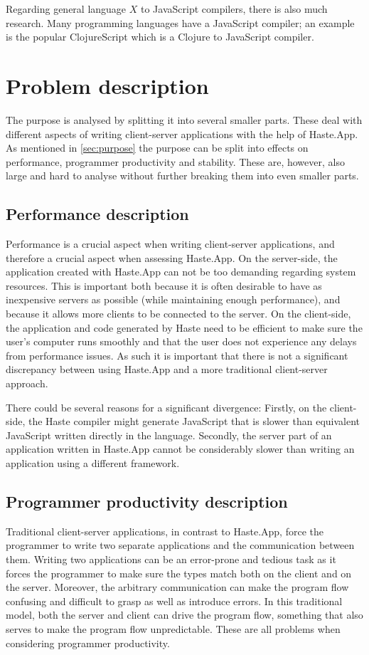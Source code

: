 \documentclass[a4paper]{article}
\begin{document}
Regarding general language $X$ to JavaScript compilers, there is also much research. Many programming languages have a JavaScript compiler; an example is the popular ClojureScript \cite{clojurescript-website} which is a Clojure to JavaScript compiler.

\section{Problem description}
\label{sec:problem}
The purpose is analysed by splitting it into several smaller parts. These deal with different aspects of writing client-server applications with the help of Haste.App. As mentioned in \cref{sec:purpose} the purpose can be split into effects on performance, programmer productivity and stability. These are, however, also large and hard to analyse without further breaking them into even smaller parts.


\subsection{Performance description}
Performance is a crucial aspect when writing client-server applications, and therefore a crucial aspect when assessing Haste.App. On the server-side, the application created with Haste.App can not be too demanding regarding system resources. This is important both because it is often desirable to have as inexpensive servers as possible (while maintaining enough performance), and because it allows more clients to be connected to the server. On the client-side, the application and code generated by Haste need to be efficient to make sure the user's computer runs smoothly and that the user does not experience any delays from performance issues. As such it is important that there is not a significant discrepancy between using Haste.App and a more traditional client-server approach. 

There could be several reasons for a significant divergence: Firstly, on the client-side, the Haste compiler might generate JavaScript that is slower than equivalent JavaScript written directly in the language. Secondly, the server part of an application written in Haste.App cannot be considerably slower than writing an application using a different framework. 

\subsection{Programmer productivity description}
\label{sec:programmer_productivity}
Traditional client-server applications, in contrast to Haste.App, force the programmer to write two separate applications and the communication between them. Writing two applications can be an error-prone and tedious task as it forces the programmer to make sure the types match both on the client and on the server. Moreover, the arbitrary communication can make the program flow confusing and difficult to grasp as well as introduce errors. In this traditional model, both the server and client can drive the program flow, something that also serves to make the program flow unpredictable. These are all problems when considering programmer productivity.
\end{document}
